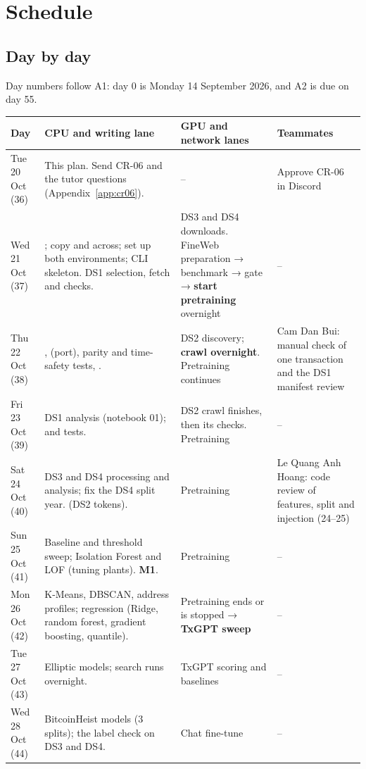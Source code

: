 \section{Schedule}
\label{sec:schedule}

\subsection{Day by day}

Day numbers follow A1: day 0 is Monday 14 September 2026, and A2 is due on day 55.

\begin{longtable}{@{}L{2.1cm}L{6.2cm}L{3.0cm}L{2.9cm}@{}}
\toprule
\textbf{Day} & \textbf{CPU and writing lane} & \textbf{GPU and network lanes} & \textbf{Teammates} \\
\midrule
\endhead
Tue 20 Oct (36) & This plan. Send CR-06 and the tutor questions (Appendix~\ref{app:cr06}). & -- & Approve CR-06 in Discord \\
Wed 21 Oct (37) & ; copy  and  across; set up both environments; CLI skeleton. DS1 selection, fetch and checks. & DS3 and DS4 downloads. FineWeb preparation → benchmark → gate → \textbf{start pretraining} overnight & -- \\
Thu 22 Oct (38) & ,  (port), parity and time-safety tests, . & DS2 discovery; \textbf{crawl overnight}. Pretraining continues & Cam Dan Bui: manual check of one transaction and the DS1 manifest review \\
Fri 23 Oct (39) & DS1 analysis (notebook 01);  and tests. & DS2 crawl finishes, then its checks. Pretraining & -- \\
Sat 24 Oct (40) & DS3 and DS4 processing and analysis; fix the DS4 split year.  (DS2 tokens). & Pretraining & Le Quang Anh Hoang: code review of features, split and injection (24--25) \\
Sun 25 Oct (41) & Baseline and threshold sweep; Isolation Forest and LOF (tuning plants). \textbf{M1}. & Pretraining & -- \\
Mon 26 Oct (42) & K-Means, DBSCAN, address profiles; regression (Ridge, random forest, gradient boosting, quantile). & Pretraining ends or is stopped → \textbf{TxGPT sweep} & -- \\
Tue 27 Oct (43) & Elliptic models; search runs overnight. & TxGPT scoring and baselines & -- \\
Wed 28 Oct (44) & BitcoinHeist models (3 splits); the label check on DS3 and DS4. & Chat fine-tune & -- \\

\end{longtable}
